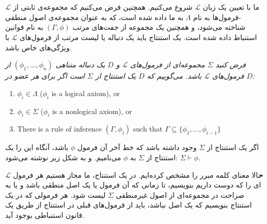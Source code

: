 \documentclass[10pt,a4paper]{article}
\newenvironment{callout}
	{\begin{calloutbox}\color{charcoal}\textbf\textit}
	{\end{calloutbox}}
\newcommand{\curveL}{\mathcal{L}}
\begin{document}
                    \\
                    \\
ما با تعیین یک زبان $\curveL$ شروع می‌کنیم. همچنین فرض می‌کنیم که مجموعه‌ی ثابتی از $\curveL$-فرمول‌ها به نام $\Lambda$ به ما داده شده است، که به عنوان مجموعه‌ی اصول منطقی شناخته می‌شود، و همچنین یک مجموعه از جفت‌های مرتب $(\Gamma, \phi)$ به نام قوانین استنباط داده شده است. یک استنتاج باید یک دنباله یا لیست مرتب از فرمول‌های $\curveL$ با ویژگی‌های خاص باشد.
                    \begin{define}
                        \textit{فرض کنید $\Sigma$ مجموعه‌ای از فرمول‌های $\curveL$ و $D$ یک دنباله متناهی $(\phi_1, \dots, \phi_n)$ از فرمول‌های $\curveL$ باشد. می‌گوییم که $D$ یک استنتاج از $\Sigma$ است اگر برای هر عضو در $D$:}
                        \begin{enumerate}
                            \item $\phi_i\in\Lambda$ ($\phi_i$ is a logical axiom), or
                            \item $\phi_i\in\Sigma$ ($\phi_i$ is a nonlogical axiom), or
                            \item There is a rule of inference $(\Gamma,\phi_i)$ such that $\Gamma\subseteq\{\phi_1,\dots,\phi_{i-1}\}$
                        \end{enumerate}
                    \end{define}
                        اگر یک استنتاج از $\Sigma$ وجود داشته باشد که خط آخر آن فرمول $\phi$ باشد، آنگاه این را یک استنتاج از $\Sigma$ به $\phi$ می‌نامیم. و به شکل زیر نوشته می‌شود: $\Sigma\vdash\phi$.
                        \begin{callout}
حالا معنای کلمه مبرر را مشخص کرده‌ایم. در یک استنتاج، ما مجاز هستیم هر فرمول $\curveL$ ای را که دوست داریم بنویسیم، تا زمانی که آن فرمول یا یک اصل منطقی باشد و یا به صراحت در مجموعه‌ای از اصول غیرمنطقی $\Sigma$ لیست شود. هر فرمولی که در یک استنتاج بنویسیم که یک اصل نباشد، باید از فرمول‌های قبلی در استنتاج از طریق یک قانون استنباطی بوجود آید.
                        \end{callout}
\end{document}
